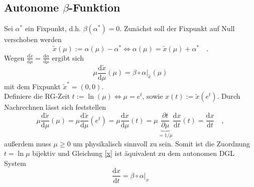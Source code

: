 \documentclass{article}
\renewcommand{\d}{\text{d}}
\begin{document}
	
  \subsection{Autonome $\beta$-Funktion}
  Sei $\alpha^*$ ein Fixpunkt, d.h. $\beta(\alpha^*)=0$. Zunächst soll der Fixpunkt auf Null verschoben werden
  \begin{equation}
   \tilde{x}(\mu):=\alpha(\mu)-\alpha^* \Leftrightarrow \alpha(\mu)=\tilde{x}(\mu)+\alpha^* \quad.
  \end{equation}
  Wegen $\frac{\d \tilde{x}}{\d \mu}=\frac{\d \alpha}{\d \mu}$ ergibt sich
  \begin{equation}
   \mu \frac{\d \tilde{x}}{\d \mu}(\mu)=\left. \beta \circ \alpha \right|_{\tilde{x}} (\mu) \label{x}
  \end{equation}
  mit dem Fixpunkt $\tilde{x}^*=(0,0)$.\\
  Definiere die RG-Zeit $t:=\ln(\mu) \Leftrightarrow \mu=e^t$, sowie $x(t):=\tilde{x}(e^t)$. Durch Nachrechnen lässt sich feststellen
  \begin{equation}
   \mu \frac{\d \tilde{x}}{\d \mu} (\mu)=\mu \frac{\d \tilde{x}}{\d \mu} (e^t)= \mu \frac{\d x}{\d \mu}(t)=
	\mu \underbrace{\frac{\partial t}{\partial \mu}}_{=1/\mu} \frac{\d x}{\d t}(t)= \frac{\d x}{\d t} \quad ,
  \end{equation}
  außerdem muss $\mu\geq 0$ um physikalisch sinnvoll zu sein. Somit ist die Zuordnung $t=\ln \mu$ bijektiv und
  Gleichung \eqref{x} ist äquivalent zu dem autonomen DGL System
  \begin{equation}
   \frac{\d x}{\d t}=\left. \beta\circ \alpha \right|_{x} \label{x_autonom}
  \end{equation}

  
\end{document}
